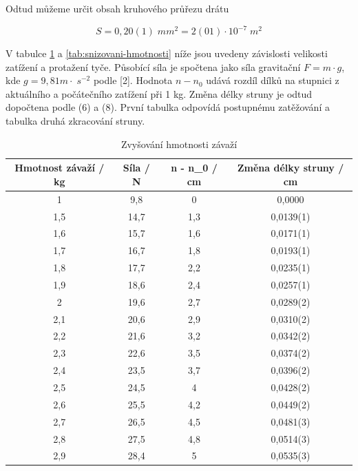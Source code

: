 Odtud můžeme určit obsah kruhového průřezu drátu

\begin{equation}
    \nonumber
    S = 0,20(1) \; mm^2 = 2(01) \cdot 10^{-7} \; m^2
\end{equation}

V tabulce \ref{tab:zvysovani-hmotnosti} a \ref{tab:snizovani-hmotnosti} níže jsou uvedeny závislosti velikosti zatížení a protažení tyče. Působící síla je spočtena jako síla gravitační \(F = m \cdot g\), kde \(g = 9,81 m \cdot \; s^{-2}\) podle [2]. Hodnota \(n - n_0\) udává rozdíl dílků na stupnici z aktuálního a počátečního zatížení při 1 kg. Změna délky struny je odtud dopočtena podle (6) a (8). První tabulka odpovídá postupnému zatěžování a tabulka druhá zkracování struny.

\begin{table}[h]
\centering
\begin{tabular}{|c|c|c|c|}
\hline
Hmotnost závaží / kg & Síla / N & n - n\_0 / cm & Změna délky struny / cm \\ \hline
1                    & 9,8      & 0             & 0,0000                  \\ \hline
1,5                  & 14,7     & 1,3           & 0,0139(1)                  \\ \hline
1,6                  & 15,7     & 1,6           & 0,0171(1)                  \\ \hline
1,7                  & 16,7     & 1,8           & 0,0193(1)                  \\ \hline
1,8                  & 17,7     & 2,2           & 0,0235(1)                  \\ \hline
1,9                  & 18,6     & 2,4           & 0,0257(1)                  \\ \hline
2                    & 19,6     & 2,7           & 0,0289(2)                  \\ \hline
2,1                  & 20,6     & 2,9           & 0,0310(2)                  \\ \hline
2,2                  & 21,6     & 3,2           & 0,0342(2)                  \\ \hline
2,3                  & 22,6     & 3,5           & 0,0374(2)                  \\ \hline
2,4                  & 23,5     & 3,7           & 0,0396(2)                  \\ \hline
2,5                  & 24,5     & 4             & 0,0428(2)                  \\ \hline
2,6                  & 25,5     & 4,2           & 0,0449(2)                  \\ \hline
2,7                  & 26,5     & 4,5           & 0,0481(3)                  \\ \hline
2,8                  & 27,5     & 4,8           & 0,0514(3)                  \\ \hline
2,9                  & 28,4     & 5             & 0,0535(3)                  \\ \hline
\end{tabular}
\caption{Zvyšování hmotnosti závaží}
\label{tab:zvysovani-hmotnosti}
\end{table}

